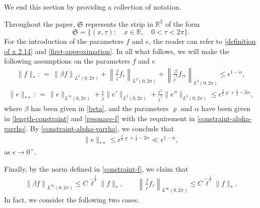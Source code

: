 \documentclass[10pt, reqno]{amsart}
\numberwithin{equation}{section}
\theoremstyle{definition}
\begin{document}
{\medskip
We end this section by providing a collection of notation.
{Throughout the paper, ${\mathfrak S}$ represents the strip in $\mathbb{R}^2$ of the form
\begin{equation}
\label{huaxies}
{\mathfrak S}=\Big\{ (x, \tau): \quad x\in {\mathbb R}, \quad 0<\tau< 2\pi\Big\}.
\end{equation}
For the introduction of the parameters $f$ and $e$, the reader can refer to \eqref{definition of x 2.14}
and \eqref{first-approximation}.
In all what follows, we will make the following assumptions on the parameters $f$ and $e$
\begin{align} \label{constraint-f}
\|f\|_* :\,=\,
\left\|\beta f\right\|_{L^2(0, 2\pi)}
+\left\|\frac{\beta}{\tilde\ell} f_\tau\right\|_{L^2(0, 2\pi)}
+\left\|\frac{\beta}{{\tilde\ell}^2} f_{\tau\tau}\right\|_{L^2(0, 2\pi)}
\leq \epsilon^{1-\alpha},
\end{align}
\begin{align} \label{constraint-e}
\|e\|_{**} : \,=\,
\|e\|_{L^{\infty}(0, 2\pi)}
 + \frac{\epsilon}{{\tilde\ell}} \|e'\|_{L^2 (0, 2\pi)}
 + \frac{\epsilon^2} {{\tilde\ell}^2}\|e''\|_{L^2(0, 2\pi)}
 \leq \epsilon^{\frac 32 \varrho + \frac 12- 2\alpha},
\end{align}
where $\beta$ has been given in \eqref{beta}, and the parameters $\varrho$ and $\alpha$ have been given in \eqref{length-constraint} and \eqref{resonace-f}
with the requirement in \eqref{constraint-alpha-varrho}.
By \eqref{constraint-alpha-varrho}, we conclude that
\begin{align*}
\|e\|_{**}  \le \epsilon^{\frac 32 \varrho + \frac 12- 2\alpha} \ll \epsilon^{1-\alpha},
\end{align*}
as $\epsilon\rightarrow 0^+$.

Finally, by the norm defined in \eqref{constraint-f}, we claim that
\begin{align} \label{Linfty of f}
\left\|\beta f\right\|_{L^\infty(0, 2\pi)} \le C\,{\tilde\ell}^{\frac 12} \|f\|_*,
\qquad
\left\|\frac{\beta}{\tilde\ell} f_\tau\right\|_{L^\infty(0, 2\pi)} \le C\,{\tilde\ell}^{\frac 12} \|f\|_*.
\end{align}
In fact, we consider the following two cases.

}}
\end{document}
